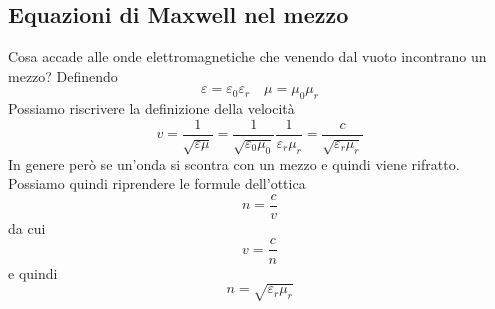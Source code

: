 \subsection{Equazioni di Maxwell nel mezzo}
Cosa accade alle onde elettromagnetiche che venendo dal vuoto incontrano un mezzo? Definendo
\begin{equation*}
  \varepsilon = \varepsilon_0\varepsilon_r \quad \mu=\mu_0\mu_r
\end{equation*}
Possiamo riscrivere la definizione della velocità
\begin{equation*}
  v = \frac{1}{\sqrt{\varepsilon\mu}} = 
  \frac{1}{\sqrt{\varepsilon_0\mu_0}}\frac{1}{\varepsilon_r\mu_r} =
  \frac{c}{\sqrt{\varepsilon_r\mu_r}}
\end{equation*}
In genere però se un'onda si scontra con un mezzo e quindi viene rifratto. Possiamo quindi 
riprendere le formule dell'ottica
\begin{equation*}
  n = \frac{c}{v}
\end{equation*}
da cui
\begin{equation*}
  v = \frac{c}{n}
\end{equation*}
e quindi
\begin{equation*}
  n = \sqrt{\varepsilon_r\mu_r} 
\end{equation*}
